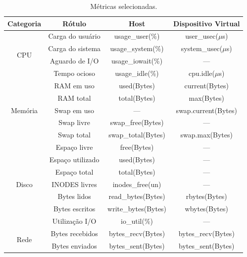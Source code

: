 \begin{table}[H]
\color{red}
\centering
\caption{Métricas selecionadas.}
\label{tab:metricas-selecionadas}
\begin{adjustbox}{max width=\textwidth}
\begin{tabular}{|c|c|c|c|}
\hline
\textbf{Categoria} & \textbf{Rótulo} & \textbf{Host} & \textbf{Dispositivo Virtual} \\ \hline
\multirow{4}{*}{CPU} & Carga do usuário & usage\_user(\%) & user\_usec($\mu$s) \\ \cline{2-4}
                     & Carga do sistema & usage\_system(\%) & system\_usec($\mu$s) \\ \cline{2-4}
                     & Aguardo de I/O & usage\_iowait(\%) & --- \\ \cline{2-4}
                     & Tempo ocioso & usage\_idle(\%) & cpu.idle($\mu$s) \\ \hline
\multirow{5}{*}{Memória} & RAM em uso & used(Bytes) & current(Bytes) \\ \cline{2-4}
                         & RAM total & total(Bytes) & max(Bytes) \\ \cline{2-4}
                         & Swap em uso & --- & swap.current(Bytes) \\ \cline{2-4}
                         & Swap livre & swap\_free(Bytes) & ---  \\ \cline{2-4}
                         & Swap total & swap\_total(Bytes) & swap.max(Bytes) \\ \hline
\multirow{7}{*}{Disco} & Espaço livre & free(Bytes)         & ---     \\ \cline{2-4}
                       & Espaço utilizado & used(Bytes)         & ---     \\ \cline{2-4}
                       & Espaço total & total(Bytes)        & ---     \\ \cline{2-4}
                       & INODES livres & inodes\_free(un) & ---     \\ \cline{2-4}
                       & Bytes lidos & read\_bytes(Bytes)  & rbytes(Bytes) \\ \cline{2-4}
                       & Bytes escritos & write\_bytes(Bytes) & wbytes(Bytes) \\ \cline{2-4}
                       & Utilização I/O & io\_util(\%)     & ---     \\ \hline
\multirow{8}{*}{Rede} & Bytes recebidos & bytes\_recv(Bytes)     & bytes\_recv(Bytes) \\ \cline{2-4}
                      & Bytes enviados & bytes\_sent(Bytes)     & bytes\_sent(Bytes) \\ \cline{2-4}

\end{tabular}
\end{adjustbox}
\end{table}
